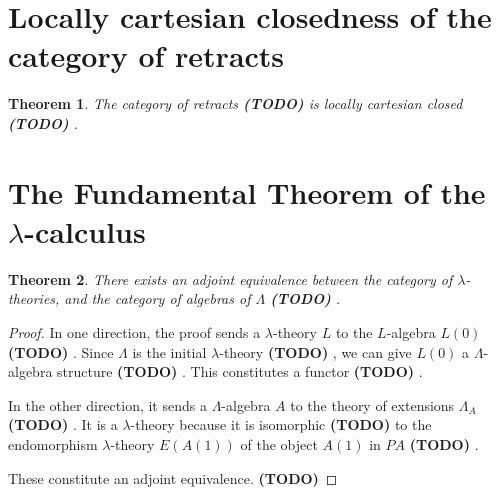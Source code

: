 \documentclass[a4paper]{amsbook}
\newtheorem{theorem}{Theorem}
\theoremstyle{definition}
\theoremstyle{remark}
\newcommand\TODO{\textbf{(TODO)} }
\begin{document}
  \section{Locally cartesian closedness of the category of retracts}
  \begin{theorem}
    The category of retracts \TODO is locally cartesian closed \TODO.
  \end{theorem}

  \section{The Fundamental Theorem of the \texorpdfstring{$ \lambda $-}{lambda }calculus}
  \begin{theorem}
    There exists an adjoint equivalence between the category of $ \lambda $-theories, and the category of algebras of $ \Lambda $ \TODO.
  \end{theorem}
  \begin{proof}
    In one direction, the proof sends a $ \lambda $-theory $ L $ to the $ L $-algebra $ L(0) $ \TODO. Since $ \Lambda $ is the initial $ \lambda $-theory \TODO, we can give $ L(0) $ a $ \Lambda $-algebra structure \TODO. This constitutes a functor \TODO.

    In the other direction, it sends a $ \Lambda $-algebra $ A $ to the theory of extensions $ \Lambda_A $ \TODO. It is a $ \lambda $-theory because it is isomorphic \TODO to the endomorphism $ \lambda $-theory $ E(A(1)) $ of the object $ A(1) $ in $ PA $ \TODO.

    These constitute an adjoint equivalence. \TODO
  \end{proof}

  
  
\end{document}
